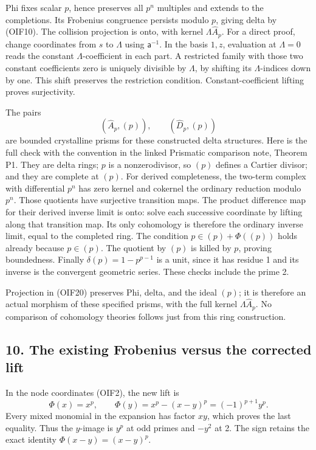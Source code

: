 \documentclass[
]{article}
\begin{document}
Phi fixes scalar \(p\), hence preserves all \(p^n\) multiples and
extends to the completions. Its Frobenius congruence persists modulo
\(p\), giving delta by (OIF10). The collision projection is onto, with
kernel \(\Lambda\widehat A_p\). For a direct proof, change coordinates
from \(s\) to \(\Lambda\) using \(\mathsf a^{-1}\). In the basis
\(1,z\), evaluation at \(\Lambda=0\) reads the constant
\(\Lambda\)-coefficient in each part. A restricted family with those two
constant coefficients zero is uniquely divisible by \(\Lambda\), by
shifting its \(\Lambda\)-indices down by one. This shift preserves the
restriction condition. Constant-coefficient lifting proves surjectivity.

The pairs \[
(\widehat A_p,(p)),\qquad(\widehat D_p,(p))
\tag{OIF20}
\] are bounded crystalline prisms for these constructed delta
structures. Here is the full check with the convention in the linked
Prismatic comparison note, Theorem P1. They are delta rings; \(p\) is a
nonzerodivisor, so \((p)\) defines a Cartier divisor; and they are
complete at \((p)\). For derived completeness, the two-term complex with
differential \(p^n\) has zero kernel and cokernel the ordinary reduction
modulo \(p^n\). Those quotients have surjective transition maps. The
product difference map for their derived inverse limit is onto: solve
each successive coordinate by lifting along that transition map. Its
only cohomology is therefore the ordinary inverse limit, equal to the
completed ring. The condition \(p\in(p)+\Phi((p))\) holds already
because \(p\in(p)\). The quotient by \((p)\) is killed by \(p\), proving
boundedness. Finally \(\delta(p)=1-p^{p-1}\) is a unit, since it has
residue 1 and its inverse is the convergent geometric series. These
checks include the prime 2.

Projection in (OIF20) preserves Phi, delta, and the ideal \((p)\); it is
therefore an actual morphism of these specified prisms, with the full
kernel \(\Lambda\widehat A_p\). No comparison of cohomology theories
follows just from this ring construction.

\subsection{10. The existing Frobenius versus the corrected
lift}\label{the-existing-frobenius-versus-the-corrected-lift}

In the node coordinates (OIF2), the new lift is \[
\Phi(x)=x^p,\qquad
\Phi(y)=x^p-(x-y)^p=(-1)^{p+1}y^p.
\tag{OIF21}
\] Every mixed monomial in the expansion has factor \(xy\), which proves
the last equality. Thus the \(y\)-image is \(y^p\) at odd primes and
\(-y^2\) at 2. The sign retains the exact identity
\(\Phi(x-y)=(x-y)^p\).
\end{document}
